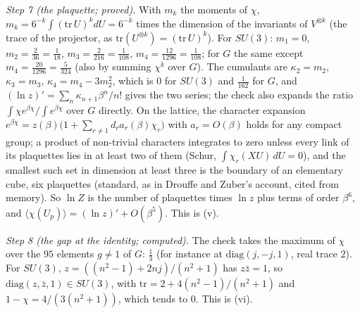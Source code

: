 \emph{Step 7 (the plaquette; proved).} With $m_{k}$ the moments of $\chi$, $m_{k} = 6^{-k}\int(\mathrm{tr}\,U)^{k}dU = 6^{-k}$ times the dimension of the invariants of $V^{\otimes k}$ (the trace of the projector, as $\mathrm{tr}(U^{\otimes k}) = (\mathrm{tr}\,U)^{k}$). For $SU(3)$: $m_{1} = 0$, $m_{2} = \tfrac{2}{36} = \tfrac1{18}$, $m_{3} = \tfrac{2}{216} = \tfrac1{108}$, $m_{4} = \tfrac{12}{1296} = \tfrac1{108}$; for $G$ the same except $m_{4} = \tfrac{20}{1296} = \tfrac{5}{324}$ (also by summing $\chi^{k}$ over $G$). The cumulants are $\kappa_{2} = m_{2}$, $\kappa_{3} = m_{3}$, $\kappa_{4} = m_{4} - 3m_{2}^{2}$, which is $0$ for $SU(3)$ and $\tfrac{1}{162}$ for $G$, and $(\ln z)' = \sum_{n}\kappa_{n+1}\beta^{n}/n!$ gives the two series; the check also expands the ratio $\int\chi e^{\beta\chi}/\int e^{\beta\chi}$ over $G$ directly. On the lattice, the character expansion $e^{\beta\chi} = z(\beta)\bigl(1 + \sum_{r \neq 1}d_{r}a_{r}(\beta)\chi_{r}\bigr)$ with $a_{r} = O(\beta)$ holds for any compact group; a product of non-trivial characters integrates to zero unless every link of its plaquettes lies in at least two of them (Schur, $\int\chi_{r}(XU)\,dU = 0$), and the smallest such set in dimension at least three is the boundary of an elementary cube, six plaquettes (standard, as in Drouffe and Zuber's account, cited from memory). So $\ln Z$ is the number of plaquettes times $\ln z$ plus terms of order $\beta^{6}$, and $\langle\chi(U_{p})\rangle = (\ln z)' + O(\beta^{5})$. This is (v).

\emph{Step 8 (the gap at the identity; computed).} The check takes the maximum of $\chi$ over the $95$ elements $g \neq 1$ of $G$: $\tfrac13$ (for instance at $\mathrm{diag}(j, -j, 1)$, real trace $2$). For $SU(3)$, $z = ((n^{2} - 1) + 2nj)/(n^{2} + 1)$ has $z\bar z = 1$, so $\mathrm{diag}(z, \bar z, 1) \in SU(3)$, with $\mathrm{tr} = 2 + 4(n^{2} - 1)/(n^{2} + 1)$ and $1 - \chi = 4/(3(n^{2} + 1))$, which tends to $0$. This is (vi).

